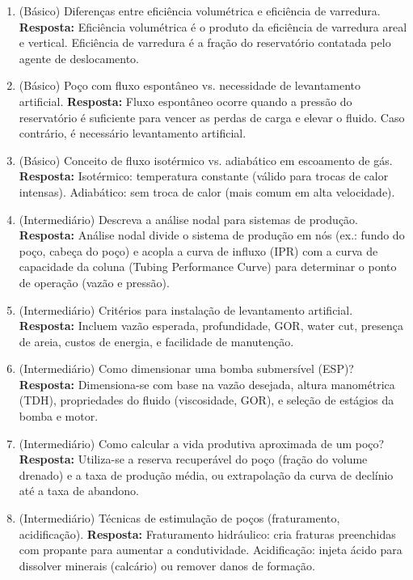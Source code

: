 \documentclass[11pt,a4paper]{article}
\begin{document}
\begin{enumerate}
  \item (Básico) Diferenças entre eficiência volumétrica e eficiência de varredura.
  \textbf{Resposta:} Eficiência volumétrica é o produto da eficiência de varredura areal e vertical. Eficiência de varredura é a fração do reservatório contatada pelo agente de deslocamento.

  \item (Básico) Poço com fluxo espontâneo vs. necessidade de levantamento artificial.
  \textbf{Resposta:} Fluxo espontâneo ocorre quando a pressão do reservatório é suficiente para vencer as perdas de carga e elevar o fluido. Caso contrário, é necessário levantamento artificial.

  \item (Básico) Conceito de fluxo isotérmico vs. adiabático em escoamento de gás.
  \textbf{Resposta:} Isotérmico: temperatura constante (válido para trocas de calor intensas). Adiabático: sem troca de calor (mais comum em alta velocidade).

  \item (Intermediário) Descreva a análise nodal para sistemas de produção.
  \textbf{Resposta:} Análise nodal divide o sistema de produção em nós (ex.: fundo do poço, cabeça do poço) e acopla a curva de influxo (IPR) com a curva de capacidade da coluna (Tubing Performance Curve) para determinar o ponto de operação (vazão e pressão).

  \item (Intermediário) Critérios para instalação de levantamento artificial.
  \textbf{Resposta:} Incluem vazão esperada, profundidade, GOR, water cut, presença de areia, custos de energia, e facilidade de manutenção.

  \item (Intermediário) Como dimensionar uma bomba submersível (ESP)?
  \textbf{Resposta:} Dimensiona-se com base na vazão desejada, altura manométrica (TDH), propriedades do fluido (viscosidade, GOR), e seleção de estágios da bomba e motor.

  \item (Intermediário) Como calcular a vida produtiva aproximada de um poço?
  \textbf{Resposta:} Utiliza-se a reserva recuperável do poço (fração do volume drenado) e a taxa de produção média, ou extrapolação da curva de declínio até a taxa de abandono.

  \item (Intermediário) Técnicas de estimulação de poços (fraturamento, acidificação).
  \textbf{Resposta:} Fraturamento hidráulico: cria fraturas preenchidas com propante para aumentar a condutividade. Acidificação: injeta ácido para dissolver minerais (calcário) ou remover danos de formação.


\end{enumerate}
\end{document}
